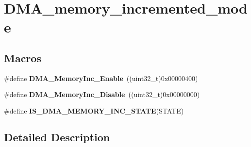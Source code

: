 \hypertarget{group___d_m_a__memory__incremented__mode}{\section{D\-M\-A\-\_\-memory\-\_\-incremented\-\_\-mode}
\label{group___d_m_a__memory__incremented__mode}
}
\subsection*{Macros}
\begin{DoxyCompactItemize}
\item 
\hypertarget{group___d_m_a__memory__incremented__mode_ga4e8cb23d039c74bbbf365d7678835bbb}{\#define {\bfseries D\-M\-A\-\_\-\-Memory\-Inc\-\_\-\-Enable}~((uint32\-\_\-t)0x00000400)}\label{group___d_m_a__memory__incremented__mode_ga4e8cb23d039c74bbbf365d7678835bbb}

\item 
\hypertarget{group___d_m_a__memory__incremented__mode_ga795a277c997048783a383b026f19a5ab}{\#define {\bfseries D\-M\-A\-\_\-\-Memory\-Inc\-\_\-\-Disable}~((uint32\-\_\-t)0x00000000)}\label{group___d_m_a__memory__incremented__mode_ga795a277c997048783a383b026f19a5ab}

\item 
\#define {\bfseries I\-S\-\_\-\-D\-M\-A\-\_\-\-M\-E\-M\-O\-R\-Y\-\_\-\-I\-N\-C\-\_\-\-S\-T\-A\-T\-E}(S\-T\-A\-T\-E)
\end{DoxyCompactItemize}


\subsection{Detailed Description}


